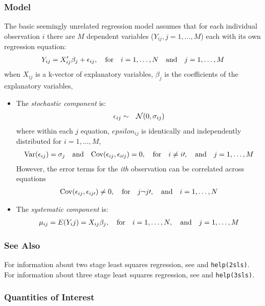\subsubsection{Model}
The basic seemingly unrelated regression model assumes that for each individual
observation $i$ there are $M$ dependent variables ($Y_{ij}, j=1,\ldots,M$) 
each with its own regression equation:
\begin{eqnarray*}
Y_{ij} = X_{ij}'\beta_j + \epsilon_{ij}, \quad  {\rm for} \quad  i=1,\ldots,N \quad {\rm and} \quad  j=1,\ldots,M
\end{eqnarray*}
when $X_{ij}$ is a k-vector of explanatory variables, $\beta_j$
is the coefficients of the explanatory variables,
\begin{itemize}
\item The \emph{stochastic component} is:
\begin{eqnarray*}
\epsilon_{ij}  &  \sim & {\cal N}(0, \sigma_{ij})
\end{eqnarray*}
where within each $j$ equation, $epsilon_{ij}$ is identically
and independently distributed for $i=1,\ldots,M$,
\begin{eqnarray*}
{\rm Var}(\epsilon_{ij})=\sigma_j \quad {\rm and} \quad {\rm Cov}(\epsilon_{ij}, \epsilon_{i\prime j})= 0, \quad {\rm for} \quad i \neq i\prime,\quad {\rm and} \quad j=1,\ldots,M 
\end{eqnarray*}
However, the error terms for the \emph{ith} observation can be correlated across equations
\begin{eqnarray*}
{\rm Cov}(\epsilon_{ij}, \epsilon_{ij\prime})\neq 0, \quad {\rm for} \quad j \neg j\prime, \quad {\rm and} \quad i=1,\ldots,N 
\end{eqnarray*}
\item The \emph{systematic component} is:
\begin{eqnarray*}
\mu_{ij}= E(Y_ij)= X_{ij}\beta_j, \quad {\rm for} \quad  i=1,\ldots,N, \quad {\rm and} \quad j=1,\ldots,M 
\end{eqnarray*}
\end{itemize}
\subsubsection{See Also}
For information about two stage least squares regression, see 
 and \texttt{help(2sls)}.
For information about three stage least squares regression, see
 and \texttt{help(3sls)}.
\subsubsection{Quantities of Interest}
